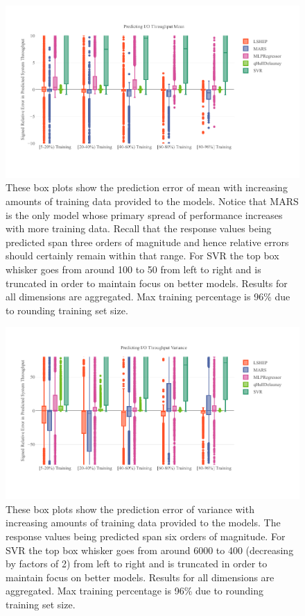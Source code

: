 \documentclass{scspaperproc}
\theoremstyle{scsthe}
\begin{document}
\begin{figure}
  \centering
  \includegraphics[width=\textwidth,trim={0 .5in 0 .3in}]{Mean_TT_Ratio.pdf}
  \caption{These box plots show the prediction error of mean with
    increasing amounts of training data provided to the models. Notice
    that MARS is the only model whose primary spread of performance
    increases with more training data. Recall that the response values
    being predicted span three orders of magnitude and hence relative
    errors should certainly remain within that range. For SVR the top
    box whisker goes from around 100 to 50 from left to right and is
    truncated in order to maintain focus on better models. Results for
    all dimensions are aggregated. Max training percentage is 96\% due
    to rounding training set size.}
  \label{fig:mean_tt_ratio}
\end{figure}

\begin{figure}
  \centering
  \includegraphics[width=\textwidth,trim={0 .5in 0 .3in}]{Var_TT_Ratio.pdf}
  \caption{These box plots show the prediction error of variance with
    increasing amounts of training data provided to the models. The
    response values being predicted span six orders of magnitude. For
    SVR the top box whisker goes from around 6000 to 400 (decreasing
    by factors of 2) from left to right and is truncated in order to
    maintain focus on better models. Results for all dimensions are
    aggregated. Max training percentage is 96\% due to rounding
    training set size.}
  \label{fig:var_tt_ratio}
\end{figure}
 
\end{document}
